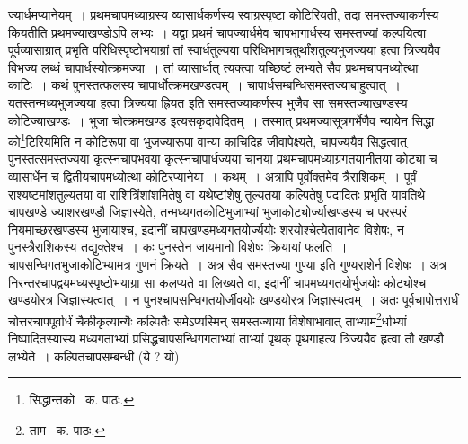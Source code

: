\documentclass[11pt, openany]{book}
\begin{document}
\noindent ज्यार्धमप्यानेयम्~। प्रथमचापमध्याग्रस्य व्यासार्धकर्णस्य स्वाग्रस्पृष्टा कोटिरियती, तदा समस्तज्याकर्णस्य कियतीति प्रथमज्याखण्डोऽपि लभ्यः~। यद्वा प्रथमं चापज्यार्धमेव चापभागार्धस्य समस्तज्यां कल्पयित्वा पूर्वव्यासाग्रात् प्रभृति परिधिस्पृष्टोभयाग्रां तां स्वार्धतुल्यया परिधिभागचतुर्थांशतुल्यभुजज्यया हत्वा त्रिज्ययैव विभज्य लब्धं चापार्धस्योत्क्रमज्या~। तां व्यासार्धात् त्यक्त्वा यच्छिष्टं लभ्यते सैव प्रथमचापमध्योत्था काटिः~। कथं पुनस्तत्फलस्य चापार्धोत्क्रमखण्डत्वम्~। चापार्धसम्बन्धिसमस्तज्याबाहुत्वात्~। यतस्तन्मध्यभुजज्यया हत्वा त्रिज्यया ह्रियत इति समस्तज्याकर्णस्य भुजैव सा समस्तज्याखण्डस्य कोटिज्याखण्डः~। भुजा चोत्क्रमखण्ड इत्यसकृदावेदितम्~। तस्मात् प्रथमज्यासूत्रगर्भेणैव न्यायेन सिद्धा को\renewcommand{\thefootnote}{१}\footnote{सिद्धान्तको \textendash\ क. पाठः.}टिरियमिति न कोटिरूपा वा भुजज्यारूपा वान्या काचिदिह जीवापेक्ष्यते, चापज्ययैव सिद्धत्वात्~। पुनस्तत्समस्तज्यया कृत्स्नचापभवया कृत्स्नचापार्धज्यया चानया प्रथमचापमध्याग्रगतयानीतया कोट्या च व्यासार्धेन च द्वितीयचापमध्योत्था कोटिरप्यानेया~। कथम्~। अत्रापि पूर्वोक्तमेव त्रैराशिकम्~। पूर्वं राश्यष्टमांशतुल्यतया वा राशित्रिंशांशमितेषु वा यथेष्टांशेषु तुल्यतया कल्पितेषु पदादितः प्रभृति यावतिथे चापखण्डे ज्याशरखण्डौ जिज्ञास्येते, तन्मध्यगतकोटिभुजाभ्यां भुजाकोट्योर्ज्याखण्डस्य च परस्परं नियमाच्छरखण्डस्य भुजायाश्च, इदानीं चापखण्डमध्यगतयोर्ज्ययोः शरयोश्चेत्येतावानेव विशेषः, न पुनस्त्रैराशिकस्य तद्युक्तेश्च~। कः पुनस्तेन जायमानो विशेषः क्रियायां फलति~। चापसन्धिगतभुजाकोटिभ्यामत्र गुणनं क्रियते~। अत्र सैव समस्तज्या गुण्या इति गुण्यराशेर्न विशेषः~। अत्र निरन्तरचापद्वयमध्यस्पृष्टोभयाग्रा सा कलप्यते वा लिख्यते वा, इदानीं चापमध्यगतयोर्भुजयोः कोट्योश्च खण्डयोरत्र जिज्ञास्यत्वात्~। न पुनश्चापसन्धिगतयोर्जीवयोः खण्डयोरत्र जिज्ञास्यत्वम्~। अतः पूर्वचापोत्तरार्धं चोत्तरचापपूर्वार्धं चैकीकृत्यान्यैः कल्पितैः समेऽप्यस्मिन् समस्तज्याया विशेषाभावात् ताभ्याम\renewcommand{\thefootnote}{२}\footnote{ताम \textendash\ क. पाठः.}र्धाभ्यां निष्पादितस्यास्य मध्यगताभ्यां प्रसिद्धचापसन्धिगगताभ्यां ताभ्यां पृथक् पृथगाहत्य त्रिज्ययैव हृत्वा तौ खण्डौ लभ्येते~। कल्पितचापसम्बन्धी (ये ? यो)

\newpage
\end{document}
